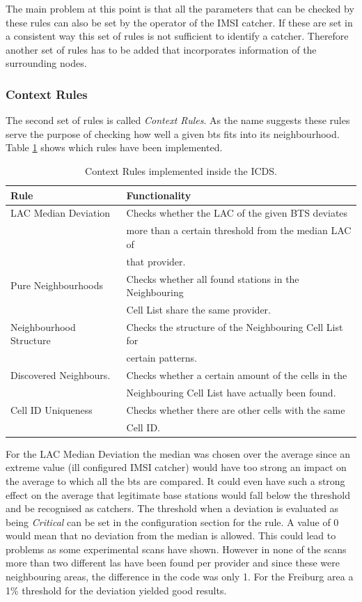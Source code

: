 The main problem at this point is that all the parameters that can be checked by these rules can also be set by the operator of the IMSI catcher.
If these are set in a consistent way this set of rules is not sufficient to identify a catcher.
Therefore another set of rules has to be added that incorporates information of the surrounding nodes.

\subsubsection{Context Rules}
The second set of rules is called \emph{Context Rules}.
As the name suggests these rules serve the purpose of checking how well a given \gls{bts} fits into its neighbourhood.
Table \ref{tab:context_rules} shows which rules have been implemented.
\begin{table}
\centering
\begin{tabular}{ll}
\toprule
Rule					&Functionality\\
\midrule
LAC Median Deviation	&Checks whether the LAC of the given BTS deviates\\
						&more than a certain threshold from the median LAC of\\
						&that provider.\\
Pure Neighbourhoods		&Checks whether all found stations in the Neighbouring\\
						&Cell List share the same provider.\\
Neighbourhood Structure	&Checks the structure of the Neighbouring Cell List for\\
						&certain patterns.\\
Discovered Neighbours. 	&Checks whether a certain amount of the cells in the\\
						&Neighbouring Cell List have actually been found.\\
Cell ID Uniqueness 		&Checks whether there are other cells with the same\\
						&Cell ID.\\
\bottomrule
\end{tabular}
\caption{Context Rules implemented inside the ICDS.}
\label{tab:context_rules}
\end{table}

For the LAC Median Deviation the median was chosen over the average since an extreme value (ill configured IMSI catcher) would have too strong an impact on the average to which all the \gls{bts} are compared.
It could even have such a strong effect on the average that legitimate base stations would fall below the threshold and be recognised as catchers.
The threshold when a deviation is evaluated as being \emph{Critical} can be set in the configuration section for the rule.
A value of 0 would mean that no deviation from the median is allowed.
This could lead to problems as some experimental scans have shown.
However in none of the scans more than two different \glspl{la} have been found per provider and since these were neighbouring areas, the difference in the code was only 1.
For the Freiburg area a 1\% threshold for the deviation yielded good results.

